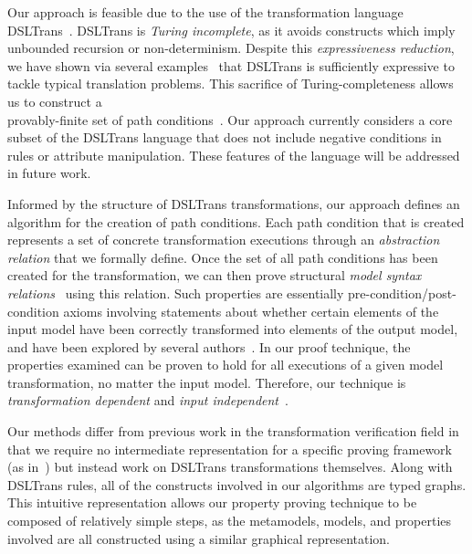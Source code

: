 Our approach is feasible due to the use of the transformation language DSLTrans~\cite{DBLP:conf/sle/BarrocaLAFS10}. DSLTrans is
\emph{Turing incomplete}, as it avoids constructs which imply unbounded
recursion or non-determinism. Despite this \emph{expressiveness reduction}, we have shown via several
examples~\cite{febavava:10,dsltrans_manual,zhang:ACP_APN:11} that DSLTrans is
sufficiently expressive to tackle typical translation problems. This sacrifice
of Turing-completeness allows us to construct a\\provably-finite set of path
conditions~\cite{Lucio:10}. Our approach currently considers a core subset
of the DSLTrans language that does not include negative conditions in rules or attribute manipulation. These features of the language will be addressed in future work.

Informed by the structure of DSLTrans transformations, our approach defines an algorithm for the creation of path conditions. Each path condition that is created represents a set of concrete
transformation executions through an \emph{abstraction relation} that we formally define. Once the set of all path conditions has been created for the transformation, we can then prove structural \emph{model syntax
relations}~\cite{DBLP:conf/icst/AmraniLSCDVTC12} using this relation. Such properties are essentially pre-condition/post-condition axioms involving statements about whether certain elements of the input model have been correctly transformed into elements of the output model, and have been explored by several authors~\cite{Akehurst:02,Narayanan:07,DBLP:journals/eceasst/CariouBBD09,DBLP:journals/ase/GuerraLWKKRSS13}.
In our proof technique, the properties examined can be proven to hold for all executions of a given
model transformation, no matter the input model.
Therefore, our technique is \emph{transformation dependent} and \emph{input
independent}~\cite{DBLP:conf/icst/AmraniLSCDVTC12}.

Our methods differ from previous work in the transformation verification field
in that we require no intermediate representation for a specific proving
framework (as in~\cite{ButtnerEC12,ButtnerECG12,DBLP:conf/icst/AsztalosLL10}) but instead work on DSLTrans
transformations themselves. Along with DSLTrans rules, all of the constructs
involved in our algorithms are typed graphs. This intuitive representation allows
our property proving technique to be composed of relatively simple steps, as the
metamodels, models, and properties involved are all constructed using a similar
graphical representation.

